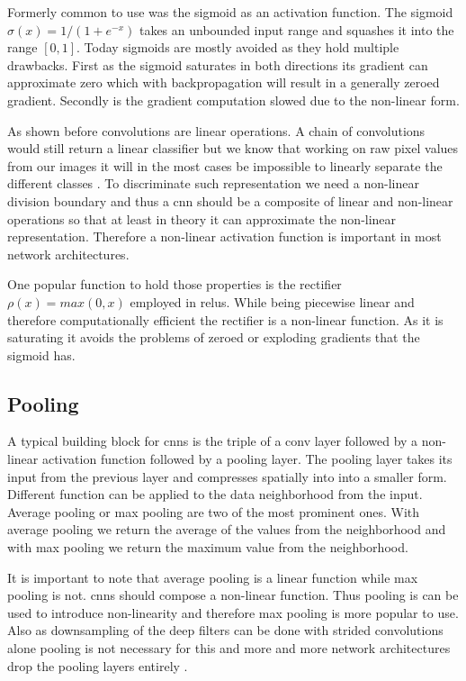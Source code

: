 Formerly common to use was the sigmoid as an activation function. The sigmoid $\sigma(x) = 1/(1+e^{-x})$  takes an unbounded input range and squashes it into the range $[0, 1]$. Today sigmoids are mostly avoided as they hold multiple drawbacks. First as the sigmoid saturates in both directions its gradient can approximate zero which with backpropagation will result in a generally zeroed gradient. Secondly is the gradient computation slowed due to the non-linear form.

As shown before convolutions are linear operations. A chain of convolutions would still return a linear classifier but we know that working on raw pixel values from our images it will in the most cases be impossible to linearly separate the different classes \citep{lecun_deep_2015}. To discriminate such representation we need a non-linear division boundary and thus a \gls{cnn} should be a composite of linear and non-linear operations so that at least in theory it can approximate the non-linear representation. Therefore a non-linear activation function is important in most network architectures.

One popular function to hold those properties is the rectifier $\rho(x) = max(0, x)$  employed in \glspl{relu}. While being piecewise linear and therefore computationally efficient the rectifier is a non-linear function. As it is saturating it avoids the problems of zeroed or exploding gradients that the sigmoid has.

\subsection{Pooling}
\label{sub:concepts:nn:pooling}
A typical building block for \glspl{cnn} is the triple of a \gls{conv} layer followed by a non-linear activation function followed by a pooling layer. The pooling layer takes its input from the previous layer and compresses spatially into into a smaller form. Different function can be applied to the data neighborhood from the input. Average pooling \citep{lecun_handwritten_1990} or max pooling \citep{zhou_computation_1988} are two of the most prominent ones. With average pooling we return the average of the values from the neighborhood and with max pooling we return the maximum value from the neighborhood.

It is important to note that average pooling is a linear function while max pooling is not. \glspl{cnn} should compose a non-linear function. Thus pooling is can be used to introduce non-linearity and therefore max pooling is more popular to use. Also as downsampling of the deep filters can be done with strided convolutions alone pooling is not necessary for this and more and more network architectures drop the pooling layers entirely \citep{springenberg_striving_2014}.

